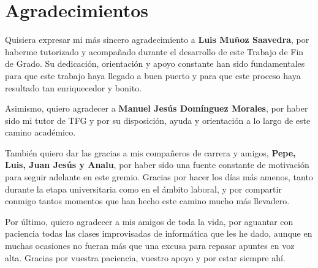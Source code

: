 \chapter*{Agradecimientos}
Quisiera expresar mi más sincero agradecimiento a \textbf{Luis Muñoz Saavedra}, por haberme tutorizado y acompañado durante el desarrollo de este Trabajo de Fin de Grado. Su dedicación, orientación y apoyo constante han sido fundamentales para que este trabajo haya llegado a buen puerto y para que este proceso haya resultado tan enriquecedor y bonito.

Asimismo, quiero agradecer a \textbf{Manuel Jesús Domínguez Morales}, por haber sido mi tutor de TFG y por su disposición, ayuda y orientación a lo largo de este camino académico.

También quiero dar las gracias a mis compañeros de carrera y amigos, \textbf{Pepe, Luis, Juan Jesús y Analu}, por haber sido una fuente constante de motivación para seguir adelante en este gremio. Gracias por hacer los días más amenos, tanto durante la etapa universitaria como en el ámbito laboral, y por compartir conmigo tantos momentos que han hecho este camino mucho más llevadero.

Por último, quiero agradecer a mis amigos de toda la vida, por aguantar con paciencia todas las clases improvisadas de informática que les he dado, aunque en muchas ocasiones no fueran más que una excusa para repasar apuntes en voz alta. Gracias por vuestra paciencia, vuestro apoyo y por estar siempre ahí.